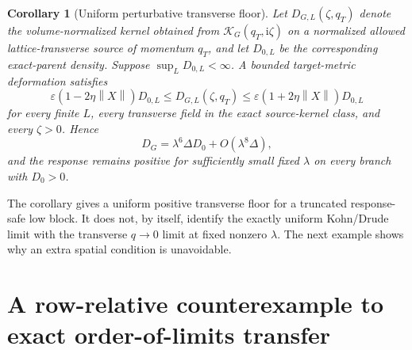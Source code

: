 \documentclass[11pt]{article}
\newtheorem{corollary}[theorem]{Corollary}
\theoremstyle{definition}
\theoremstyle{remark}
\newcommand{\cK}{\mathcal K}
\newcommand{\I}{\mathrm i}
\newcommand{\norm}[1]{\left\lVert #1\right\rVert}
\newcommand{\eps}{\varepsilon}
\begin{document}
\begin{corollary}[Uniform perturbative transverse floor]
\label{cor:floor}
Let $D_{G,L}(\zeta,q_T)$ denote the volume-normalized kernel obtained from
$\cK_G(q_T,\I\zeta)$ on a normalized allowed lattice-transverse source of
momentum $q_T$, and let $D_{0,L}$ be the corresponding exact-parent density.
Suppose $\sup_LD_{0,L}<\infty$.  A bounded target-metric deformation satisfies
\begin{equation}
 \eps(1-2\eta\norm X)D_{0,L}
 \le D_{G,L}(\zeta,q_T)
 \le\eps(1+2\eta\norm X)D_{0,L}
 \label{eq:floor-bound}
\end{equation}
for every finite $L$, every transverse field in the exact source-kernel class,
and every $\zeta>0$.  Hence
\begin{equation}
 D_{G}=\lambda^6\Delta D_0+O(\lambda^8\Delta),
 \label{eq:transfer-order8}
\end{equation}
and the response remains positive for sufficiently small fixed $\lambda$ on
every branch with $D_0>0$.
\end{corollary}

The corollary gives a uniform positive transverse floor for a truncated
response-safe low block.  It does not, by itself, identify the exactly uniform
Kohn/Drude limit with the transverse $q\to0$ limit at fixed nonzero
$\lambda$.  The next example shows why an extra spatial condition is
unavoidable.

\section{A row-relative counterexample to exact order-of-limits transfer}
\label{sec:anisotropic-counterexample}
\end{document}
